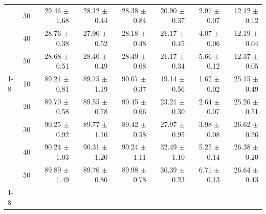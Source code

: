 \begin{table}[t]
\begin{tabular}{llrrrrrr}
 & 30 & 29.46 $\pm$ 1.68 & 28.12 $\pm$ 0.44 & 28.38 $\pm$ 0.84 & 20.90 $\pm$ 0.37 & 2.97 $\pm$ 0.07 & 12.12 $\pm$ 0.12 \\
 & 40 & 28.76 $\pm$ 0.38 & 27.90 $\pm$ 0.52 & 28.18 $\pm$ 0.48 & 21.17 $\pm$ 0.45 & 4.07 $\pm$ 0.06 & 12.19 $\pm$ 0.04 \\
 & 50 & 28.68 $\pm$ 0.51 & 28.40 $\pm$ 0.49 & 28.49 $\pm$ 0.68 & 21.17 $\pm$ 0.34 & 5.66 $\pm$ 0.12 & 12.37 $\pm$ 0.05 \\
\cline{1-8}
\multirow[t]{5}{*}{VNTC--CNTT} & 10 & 89.21 $\pm$ 0.81 & 89.75 $\pm$ 1.19 & 90.67 $\pm$ 0.37 & 19.14 $\pm$ 0.56 & 1.62 $\pm$ 0.02 & 25.15 $\pm$ 0.49 \\
 & 20 & 89.70 $\pm$ 0.58 & 89.55 $\pm$ 0.78 & 90.45 $\pm$ 0.66 & 23.21 $\pm$ 0.30 & 2.64 $\pm$ 0.07 & 25.26 $\pm$ 0.51 \\
 & 30 & 90.25 $\pm$ 0.92 & 89.77 $\pm$ 1.10 & 89.42 $\pm$ 0.58 & 27.97 $\pm$ 0.95 & 3.98 $\pm$ 0.08 & 26.62 $\pm$ 0.26 \\
 & 40 & 90.24 $\pm$ 1.03 & 90.31 $\pm$ 1.20 & 90.24 $\pm$ 1.11 & 32.49 $\pm$ 1.10 & 5.25 $\pm$ 0.14 & 26.38 $\pm$ 0.20 \\
 & 50 & 89.89 $\pm$ 1.49 & 89.76 $\pm$ 0.86 & 89.98 $\pm$ 0.78 & 36.39 $\pm$ 0.23 & 6.71 $\pm$ 0.13 & 26.64 $\pm$ 0.43 \\
\cline{1-8}
\bottomrule
\end{tabular}

\end{table}
